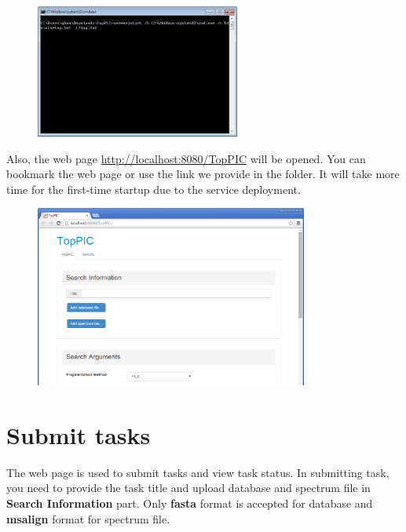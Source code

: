 \documentclass[12pt,letterpaper]{article}
\begin{document}
\begin{figure}[H]
\begin{center}
    \includegraphics[width=0.6\textwidth]{fig/3.png}
\end{center}
\end{figure}

Also, the web page \url{http://localhost:8080/TopPIC} will be opened.
You can bookmark the web page or use the link we provide in the folder.
It will take more time for the first-time startup due to the service deployment.

\begin{figure}[H]
\begin{center}
    \includegraphics[width=0.8\textwidth]{fig/4.png}
\end{center}
\end{figure}

\section{Submit tasks}

The web page is used to submit tasks and view task status.
In submitting task, you need to provide the task title and upload database
and spectrum file in \textbf{Search Information} part. Only \textbf{fasta} 
format is accepted for database and \textbf{msalign} format for spectrum file.
\end{document}

